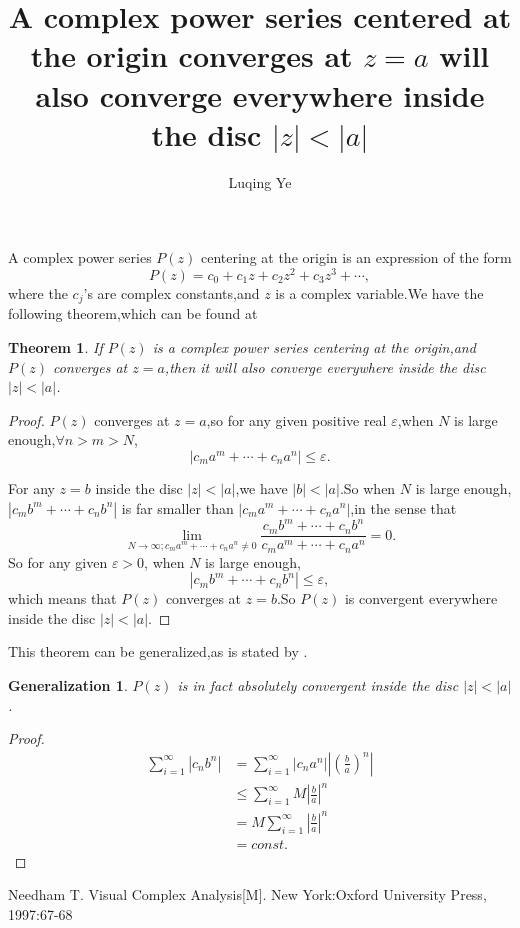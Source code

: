 \documentclass{amsart}
\theoremstyle{plain}
\newtheorem{theorem}{Theorem}
\newtheorem{generalization}{Generalization}[theorem]
\theoremstyle{definition}
\begin{document}
\title{A complex power series centered at the origin converges at
$z=a$ will also converge everywhere inside the disc $|z|<|a|$ }

\author{Luqing Ye}
\address{College of Science, Hangzhou Normal University,Hangzhou City,Zhejiang Province,China}

\maketitle

\setcounter{tocdepth}{2}
  A complex power series $P(z)$ centering at the origin is an
  expression of the form 
$$
P(z)=c_0+c_1z+c_2z^2+c_3z^3+\cdots,
$$
where the $c_j$'s are complex constants,and $z$ is a complex
variable.We have the following theorem,which can be
found at \cite{visualcomplexanalysis}
\begin{theorem}
If $P(z)$ is a complex power series centering at the origin,and $P(z)$
converges at $z=a$,then it will also converge everywhere inside the
disc $|z|<|a|$.
\end{theorem}
\begin{proof}
$P(z)$ converges at $z=a$,so for any given positive real $\varepsilon$,when $N$ is large enough,$\forall
n>m>N$,$$|c_{m}a^{m}+\cdots+c_na^n|\leq \varepsilon.$$


For any $z=b$ inside the disc $|z|<|a|$,we have $|b|<|a|$.So when $N$
is large enough,$|c_{m}b^{m}+\cdots+c_nb^n|$ is far smaller than
$|c_{m}a^{m}+\cdots+c_na^n|$,in the sense that
$$
\lim_{N\to\infty;c_{m}a^{m}+\cdots+c_{n}a^{n}\neq 0}\frac{c_{m}b^{m}+\cdots+c_nb^n}{c_{m}a^{m}+\cdots+c_na^n}=0.
$$
So for any given $\varepsilon>0$, when $N$ is large enough,
$$
|c_mb^m+\cdots+c_nb^n|\leq\varepsilon,
$$
which means that $P(z)$ converges at $z=b$.So $P(z)$ is convergent
everywhere inside the disc $|z|<|a|$.
\end{proof}

This theorem can be generalized,as is stated by \cite{visualcomplexanalysis}.
\begin{generalization}
$P(z)$ is in fact absolutely convergent inside the disc $|z|<|a|$.  
\end{generalization}
\begin{proof}
\begin{align*}
\sum_{i=1}^{\infty}|c_nb^n|&=\sum_{i=1}^{\infty}|c_na^n||
(\frac{b}{a})^n|\\&\leq \sum_{i=1}^{\infty}M|\frac{b}{a}|^n\\&=M \sum_{i=1}^{\infty}|\frac{b}{a}|^n\\&=const.
\end{align*}

\end{proof}

\begin{thebibliography}{1}

Needham T. Visual Complex Analysis[M]. New York:Oxford University Press, 1997:67-68

\end{thebibliography}
\end{document}
